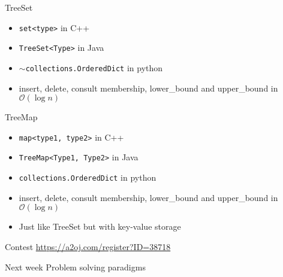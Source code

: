 \documentclass{beamer}
\begin{document}
\begin{frame}{TreeSet}
  \begin{itemize}
  \item \texttt{set<type>} in C++
  \item \texttt{TreeSet<Type>} in Java
  \item $\sim$\texttt{collections.OrderedDict} in python
  \item insert, delete, consult membership, lower\_bound and upper\_bound in $\mathcal{O}(\log{n})$ 
  \end{itemize}
\end{frame}

\begin{frame}{TreeMap}
  \begin{itemize}
  \item \texttt{map<type1, type2>} in C++
  \item \texttt{TreeMap<Type1, Type2>} in Java
  \item \texttt{collections.OrderedDict} in python
  \item insert, delete, consult membership, lower\_bound and upper\_bound in $\mathcal{O}(\log{n})$ 
  \item Just like TreeSet but with key-value storage 
  \end{itemize}
\end{frame}

\begin{frame}{Contest}
  \href{https://a2oj.com/register?ID=38718}{https://a2oj.com/register?ID=38718}
\end{frame}

\begin{frame}{Next week}
  \centering 
  \Large
  Problem solving paradigms
\end{frame}
\end{document}
